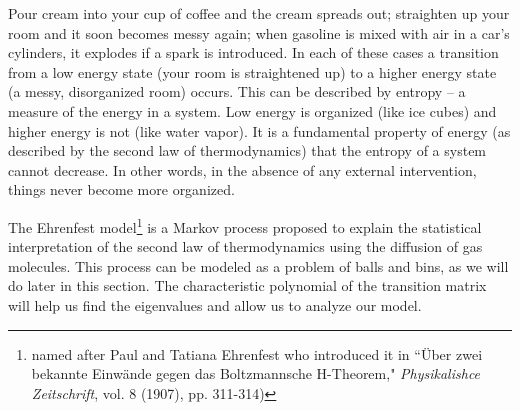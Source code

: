  \label{chap:characteristic_equation}

\vspace*{-17 pt}

\vspace*{13 pt}

\label{sec:appl_thermo}

Pour cream into your cup of coffee and the cream spreads out; straighten up your room and it soon becomes messy again; when gasoline is mixed with air in a car's cylinders, it explodes if a spark is introduced. In each of these cases a transition from a low energy state (your room is straightened up) to a higher energy state (a messy, disorganized room) occurs. This can be described by entropy -- a measure of the energy in a system. Low energy is organized (like ice cubes) and higher energy is not (like water vapor). It is a fundamental property of energy (as described by the second law of thermodynamics) that the entropy of a system cannot decrease. In other words, in the absence of any external intervention, things never become more organized.

The Ehrenfest model\footnote{named after Paul and Tatiana Ehrenfest who introduced it in ``{\"U}ber zwei bekannte Einw{\"a}nde gegen das Boltzmannsche H-Theorem," \emph{Physikalishce Zeitschrift}, vol. 8 (1907), pp. 311-314)} is a Markov process proposed to explain the statistical interpretation of the second law of thermodynamics using the diffusion of gas molecules. This process can be modeled as a problem of balls and bins, as we will do later in this section. The characteristic polynomial of the transition matrix will help us find the eigenvalues and allow us to analyze our model. 


